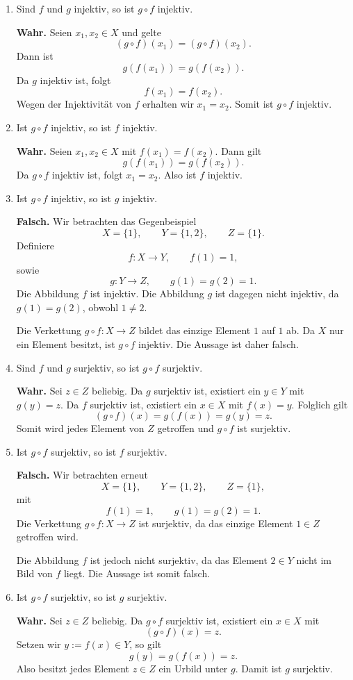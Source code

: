 \documentclass{report}
\begin{document}
\begin{enumerate}[label=(\alph*)]
  \item Sind \(f\) und \(g\) injektiv, so ist \(g\circ f\) injektiv.

  \textbf{Wahr.} Seien \(x_1,x_2\in X\) und gelte
  \[
  (g\circ f)(x_1)=(g\circ f)(x_2).
  \]
  Dann ist
  \[
  g(f(x_1))=g(f(x_2)).
  \]
  Da \(g\) injektiv ist, folgt
  \[
  f(x_1)=f(x_2).
  \]
  Wegen der Injektivität von \(f\) erhalten wir \(x_1=x_2\). Somit ist \(g\circ f\) injektiv.

  \item Ist \(g\circ f\) injektiv, so ist \(f\) injektiv.

  \textbf{Wahr.} Seien \(x_1,x_2\in X\) mit \(f(x_1)=f(x_2)\). Dann gilt
  \[
  g(f(x_1))=g(f(x_2)).
  \]
  Da \(g\circ f\) injektiv ist, folgt \(x_1=x_2\). Also ist \(f\) injektiv.

  \item Ist \(g\circ f\) injektiv, so ist \(g\) injektiv.

  \textbf{Falsch.} Wir betrachten das Gegenbeispiel
  \[
  X=\{1\},\qquad Y=\{1,2\},\qquad Z=\{1\}.
  \]
  Definiere
  \[
  f\colon X\to Y,\qquad f(1)=1,
  \]
  sowie
  \[
  g\colon Y\to Z,\qquad g(1)=g(2)=1.
  \]
  Die Abbildung \(f\) ist injektiv. Die Abbildung \(g\) ist dagegen nicht injektiv, da \(g(1)=g(2)\), obwohl \(1\ne2\).

  Die Verkettung \(g\circ f\colon X\to Z\) bildet das einzige Element \(1\) auf \(1\) ab. Da \(X\) nur ein Element besitzt, ist \(g\circ f\) injektiv. Die Aussage ist daher falsch.

  \item Sind \(f\) und \(g\) surjektiv, so ist \(g\circ f\) surjektiv.

  \textbf{Wahr.} Sei \(z\in Z\) beliebig. Da \(g\) surjektiv ist, existiert ein \(y\in Y\) mit \(g(y)=z\). Da \(f\) surjektiv ist, existiert ein \(x\in X\) mit \(f(x)=y\). Folglich gilt
  \[
  (g\circ f)(x)=g(f(x))=g(y)=z.
  \]
  Somit wird jedes Element von \(Z\) getroffen und \(g\circ f\) ist surjektiv.

  \item Ist \(g\circ f\) surjektiv, so ist \(f\) surjektiv.

  \textbf{Falsch.} Wir betrachten erneut
  \[
  X=\{1\},\qquad Y=\{1,2\},\qquad Z=\{1\},
  \]
  mit
  \[
  f(1)=1,\qquad g(1)=g(2)=1.
  \]
  Die Verkettung \(g\circ f\colon X\to Z\) ist surjektiv, da das einzige Element \(1\in Z\) getroffen wird.

  Die Abbildung \(f\) ist jedoch nicht surjektiv, da das Element \(2\in Y\) nicht im Bild von \(f\) liegt. Die Aussage ist somit falsch.

  \item Ist \(g\circ f\) surjektiv, so ist \(g\) surjektiv.

  \textbf{Wahr.} Sei \(z\in Z\) beliebig. Da \(g\circ f\) surjektiv ist, existiert ein \(x\in X\) mit
  \[
  (g\circ f)(x)=z.
  \]
  Setzen wir \(y:=f(x)\in Y\), so gilt
  \[
  g(y)=g(f(x))=z.
  \]
  Also besitzt jedes Element \(z\in Z\) ein Urbild unter \(g\). Damit ist \(g\) surjektiv.
\end{enumerate}
\end{document}
